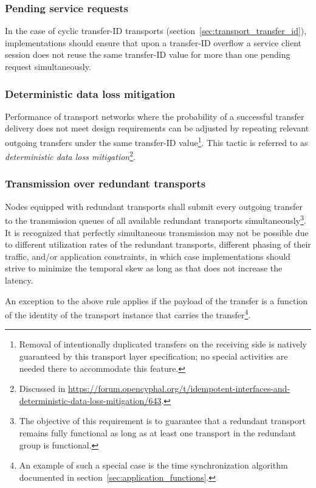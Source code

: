 \subsubsection{Pending service requests}

In the case of cyclic transfer-ID transports (section~\ref{sec:transport_transfer_id}),
implementations should ensure that upon a transfer-ID overflow a service client session
does not reuse the same transfer-ID value for more than one pending request simultaneously.

\subsubsection{Deterministic data loss mitigation}\label{sec:transport_deterministic_data_loss_mitigation}

Performance of transport networks where the probability of a successful transfer delivery
does not meet design requirements can be adjusted by repeating relevant outgoing transfers
under the same transfer-ID value\footnote{%
    Removal of intentionally duplicated transfers on the receiving side is natively guaranteed
    by this transport layer specification;
    no special activities are needed there to accommodate this feature.
}.
This tactic is referred to as \emph{deterministic data loss mitigation}\footnote{%
    Discussed in
    \url{https://forum.opencyphal.org/t/idempotent-interfaces-and-deterministic-data-loss-mitigation/643}.
}.

\subsubsection{Transmission over redundant transports}

Nodes equipped with redundant transports shall submit every outgoing transfer to the transmission queues of all
available redundant transports simultaneously\footnote{%
    The objective of this requirement is to guarantee that a redundant transport remains fully functional
    as long as at least one transport in the redundant group is functional.
}.
It is recognized that perfectly simultaneous transmission may not be possible due to different
utilization rates of the redundant transports, different phasing of their traffic, and/or application constraints,
in which case implementations should strive to minimize the temporal skew as long as that
does not increase the latency.

An exception to the above rule applies if the payload of the transfer is a function of
the identity of the transport instance that carries the transfer\footnote{%
    An example of such a special case is the time synchronization algorithm documented
    in section~\ref{sec:application_functions}.
}.

